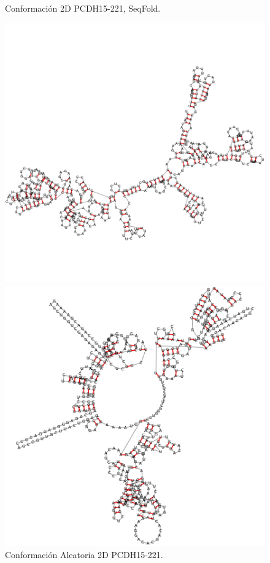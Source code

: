 \documentclass[a4paper,11pt,titlepage]{article}
\theoremstyle{definition}
\begin{document}
\begin{figure}[H]
\begin{minipage}[c]{0.23\textwidth}
        \caption{Conformación 2D PCDH15-221, SeqFold.}
        \label{fig:PCDH15-221-sqf}
    \end{minipage}
    \hfill
    \begin{minipage}[c]{0.23\textwidth}
        \centering
        \includegraphics[width=\textwidth]{images/PCDH15-221-db_rndc.png}
        \caption{Conformación Aleatoria 2D PCDH15-221.}
        \label{fig:PCDH15-221-rndc}
    \end{minipage}
    \hfill
    \begin{minipage}[c]{0.23\textwidth}
        \centering
        \includegraphics[width=\textwidth]{images/PCDH15-221-db_one_conf.png}

\end{minipage}
\end{figure}
\end{document}
